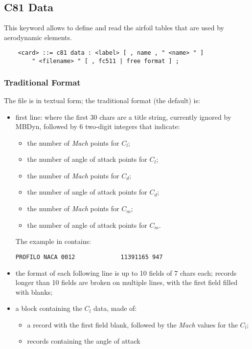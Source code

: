 \subsection{C81 Data}\label{sec:C81-DATA}
This keyword allows to define and read the  
airfoil tables that are used by aerodynamic elements.
\begin{verbatim}
    <card> ::= c81 data : <label> [ , name , " <name> " ]
        " <filename> " [ , fc511 | free format ] ;
\end{verbatim}

\subsubsection{Traditional Format}
The file is in textual form; the traditional format (the default) is:
\begin{itemize}
\item first line:  
where the first 30 chars are a title string, currently ignored by MBDyn,
followed by 6 two-digit integers that indicate:
	\begin{itemize}
	\item the number  of \emph{Mach} points for $C_l$;
	\item the number  of angle of attack points for $C_l$;
	\item the number  of \emph{Mach} points for $C_d$;
	\item the number  of angle of attack points for $C_d$;
	\item the number  of \emph{Mach} points for $C_m$;
	\item the number  of angle of attack points for $C_m$.
	\end{itemize}
The example in  contains:
{\small
\begin{verbatim}
PROFILO NACA 0012             11391165 947
\end{verbatim}
}
\item the format of each following line is up to 10 fields of 7 chars each;
records longer than 10 fields are broken on multiple lines,
with the first field filled with blanks;
\item a block containing the $C_l$ data, made of:
	\begin{itemize}
	\item a record with the first field blank, followed by
	the  \emph{Mach} values for the $C_l$;
	\item {} records containing the angle of attack

\end{itemize}
\end{itemize}
